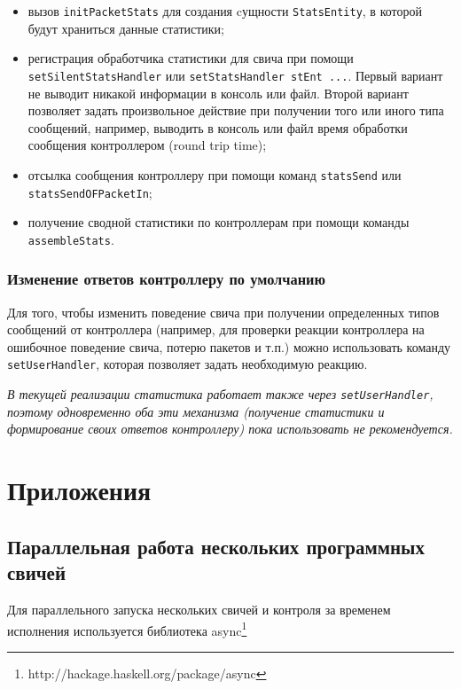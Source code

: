 \documentclass[9pt,a4paper]{article}
\begin{document}
\begin{itemize}
  \item вызов \lstinline!initPacketStats! для создания cущности
    \lstinline!StatsEntity!, в которой будут храниться данные статистики;
  \item регистрация обработчика статистики для свича при помощи
    \lstinline!setSilentStatsHandler! или \lstinline!setStatsHandler stEnt ...!.
    Первый вариант не выводит никакой информации в консоль или файл.  Второй
    вариант позволяет задать произвольное действие при получении того или иного
    типа сообщений, например, выводить в консоль или файл время обработки
    сообщения контроллером (round trip time);
  \item отсылка сообщения контроллеру при помощи команд \lstinline!statsSend!
    или \lstinline!statsSendOFPacketIn!;
  \item получение сводной статистики по контроллерам при помощи команды
    \lstinline!assembleStats!.
\end{itemize}

\subsubsection{Изменение ответов контроллеру по умолчанию}

Для того, чтобы изменить поведение свича при получении определенных типов
сообщений от контроллера (например, для проверки реакции контроллера на
ошибочное поведение свича, потерю пакетов и т.п.)  можно использовать команду
\lstinline!setUserHandler!, которая позволяет задать необходимую реакцию.

\emph{В текущей реализации статистика работает также через
  \lstinline!setUserHandler!, поэтому одновременно оба эти механизма (получение
  статистики и формирование своих ответов контроллеру) пока использовать не
  рекомендуется.}

\section{Приложения}

\subsection{Параллельная работа нескольких программных свичей}

Для параллельного запуска нескольких свичей и контроля за временем исполнения
используется библиотека async\footnote{http://hackage.haskell.org/package/async}
\end{document}
